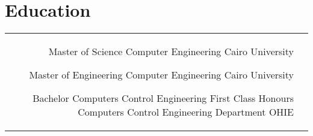 \documentclass[10pt]{article} %
\begin{document}
\begin{paracol}{2}
{{\begin{supertabular}{p{0.05\linewidth}|p{0.775\linewidth}}
		\end{supertabular}
	}
}


\section{Education} 





\begin{supertabular}{rl} %

	
	{Master of Science} %
	{} %
	{Computer Engineering} %
	{Cairo University} %
	
	
	{Master of Engineering} %
	{} %
	{Computer Engineering} %
	{Cairo University} %
	
	
	{Bachelor Computers Control Engineering} %
	{First Class Honours} %
	{ Computers Control Engineering Department} %
	{OHIE} %
	

\end{supertabular}
\end{paracol}
\end{document}
